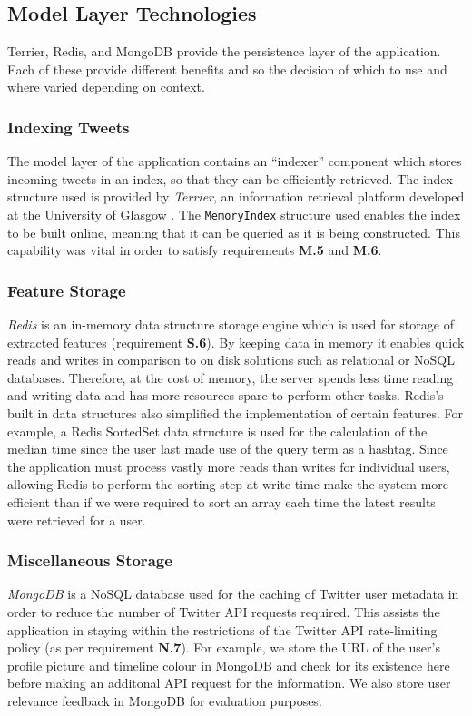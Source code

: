 \documentclass{l4proj}
\newcommand{\code}[1]{\texttt{#1}}
\begin{document}
    \subsection{Model Layer Technologies}
    Terrier, Redis, and MongoDB provide the persistence layer of the application. Each of these provide different benefits and so the decision of which to use and where varied depending on context.
    
        \subsubsection{Indexing Tweets}
        The model layer of the application contains an ``indexer'' component which stores incoming tweets in an index, so that they can be efficiently retrieved. The index structure used is provided by \textit{Terrier}, an information retrieval platform developed at the University of Glasgow \cite{macdonald2012puppy}. The \code{MemoryIndex} structure used enables the index to be built online, meaning that it can be queried as it is being constructed. This capability was vital in order to satisfy requirements \textbf{M.5} and \textbf{M.6}.
        
        \subsubsection{Feature Storage}
        \textit{Redis} is an in-memory data structure storage engine which is used for storage of extracted features (requirement \textbf{S.6}). By keeping data in memory it enables quick reads and writes in comparison to on disk solutions such as relational or NoSQL databases. Therefore, at the cost of memory, the server spends less time reading and writing data and has more resources spare to perform other tasks. Redis's built in data structures also simplified the implementation of certain features. For example, a Redis SortedSet data structure is used for the calculation of the median time since the user last made use of the query term as a hashtag. Since the application must process vastly more reads than writes for individual users, allowing Redis to perform the sorting step at write time make the system more efficient than if we were required to sort an array each time the latest results were retrieved for a user.
        
         \subsubsection{Miscellaneous Storage}
         \textit{MongoDB} is a NoSQL database used for the caching of Twitter user metadata in order to reduce the number of Twitter API requests required. This assists the application in staying within the restrictions of the Twitter API rate-limiting policy (as per requirement \textbf{N.7}). For example, we store the URL of the user's profile picture and timeline colour in MongoDB and check for its existence here before making an additonal API request for the information. We also store user relevance feedback in MongoDB for evaluation purposes.
         
\end{document}

